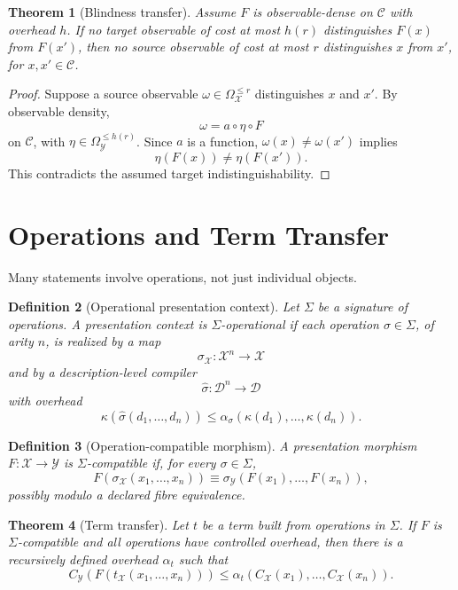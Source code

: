 \documentclass[11pt]{article}
\newtheorem{theorem}{Theorem}[section]
\newtheorem{definition}[theorem]{Definition}
\begin{document}
\begin{theorem}[Blindness transfer]
Assume \(F\) is observable-dense on \(\mathcal C\) with overhead \(h\). If no target observable of cost at most \(h(r)\) distinguishes \(F(x)\) from \(F(x')\), then no source observable of cost at most \(r\) distinguishes \(x\) from \(x'\), for \(x,x'\in\mathcal C\).
\end{theorem}

\begin{proof}
Suppose a source observable \(\omega\in\Omega_\mathcal X^{\leq r}\) distinguishes \(x\) and \(x'\). By observable density,
\[
\omega=a\circ\eta\circ F
\]
on \(\mathcal C\), with \(\eta\in\Omega_\mathcal Y^{\leq h(r)}\). Since \(a\) is a function, \(\omega(x)\ne\omega(x')\) implies
\[
\eta(F(x))\ne\eta(F(x')).
\]
This contradicts the assumed target indistinguishability.
\end{proof}

\section{Operations and Term Transfer}

Many statements involve operations, not just individual objects.

\begin{definition}[Operational presentation context]
Let \(\Sigma\) be a signature of operations. A presentation context is \(\Sigma\)-operational if each operation \(\sigma\in\Sigma\), of arity \(n\), is realized by a map
\[
\sigma_\mathcal X:\mathcal X^n\to\mathcal X
\]
and by a description-level compiler
\[
\widehat\sigma:\mathcal D^n\to\mathcal D
\]
with overhead
\[
\kappa(\widehat\sigma(d_1,\ldots,d_n))
\leq
\alpha_\sigma(\kappa(d_1),\ldots,\kappa(d_n)).
\]
\end{definition}

\begin{definition}[Operation-compatible morphism]
A presentation morphism \(F:\mathcal X\to\mathcal Y\) is \(\Sigma\)-compatible if, for every \(\sigma\in\Sigma\),
\[
F(\sigma_\mathcal X(x_1,\ldots,x_n))
\equiv
\sigma_\mathcal Y(F(x_1),\ldots,F(x_n)),
\]
possibly modulo a declared fibre equivalence.
\end{definition}

\begin{theorem}[Term transfer]
Let \(t\) be a term built from operations in \(\Sigma\). If \(F\) is \(\Sigma\)-compatible and all operations have controlled overhead, then there is a recursively defined overhead \(\alpha_t\) such that
\[
C_\mathcal Y(F(t_\mathcal X(x_1,\ldots,x_n)))
\leq
\alpha_t(C_\mathcal X(x_1),\ldots,C_\mathcal X(x_n)).
\]
\end{theorem}
\end{document}
